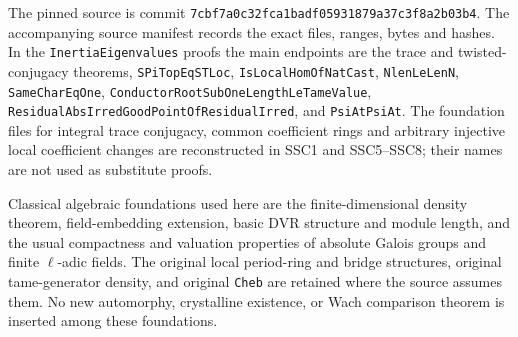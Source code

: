 The pinned source is commit
\texttt{7cbf7a0c32fca1badf05931879a37c3f8a2b03b4}.
The accompanying source manifest records the exact files, ranges,
bytes and hashes. In the \texttt{InertiaEigenvalues} proofs the
main endpoints are the trace and twisted-conjugacy theorems,
\texttt{SPiTopEqSTLoc}, \texttt{IsLocalHomOfNatCast},
\texttt{NlenLeLenN}, \texttt{SameCharEqOne},
\texttt{ConductorRoot\allowbreak SubOneLength\allowbreak LeTameValue},
\texttt{ResidualAbsIrred\allowbreak GoodPointOf\allowbreak ResidualIrred}, and
\texttt{PsiAtPsiAt}. The foundation files for integral trace
conjugacy, common coefficient rings and arbitrary injective local
coefficient changes are reconstructed in SSC1 and SSC5--SSC8;
their names are not used as substitute proofs.

Classical algebraic foundations used here are the
finite-dimensional density theorem, field-embedding extension,
basic DVR structure and module length, and the usual compactness
and valuation properties of absolute Galois groups and finite
$\ell$-adic fields. The original local period-ring and bridge
structures, original tame-generator density, and original
\texttt{Cheb} are retained where the source assumes them.
No new automorphy, crystalline existence, or Wach comparison
theorem is inserted among these foundations.
